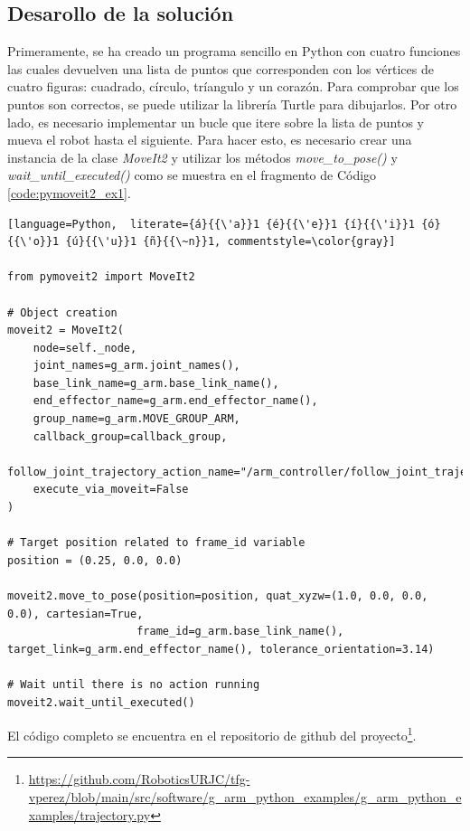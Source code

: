 \subsection*{Desarollo de la solución}
\noindent Primeramente, se ha creado un programa sencillo en Python con cuatro funciones las cuales devuelven una lista de puntos que corresponden 
con los vértices de cuatro figuras: cuadrado, círculo, tríangulo y un corazón. Para comprobar que los puntos son correctos, se puede utilizar la librería 
Turtle para dibujarlos. Por otro lado, es necesario implementar un bucle que itere sobre la lista de puntos y mueva el robot hasta el siguiente. Para hacer 
esto, es necesario crear una instancia de la clase \textit{MoveIt2} y utilizar los métodos \textit{move\_to\_pose()} y \textit{wait\_until\_executed()} 
como se muestra en el fragmento de Código \ref{code:pymoveit2_ex1}.
\begin{code}[ht!]
\begin{lstlisting}[language=Python,  literate={á}{{\'a}}1 {é}{{\'e}}1 {í}{{\'i}}1 {ó}{{\'o}}1 {ú}{{\'u}}1 {ñ}{{\~n}}1, commentstyle=\color{gray}]
    
from pymoveit2 import MoveIt2

# Object creation
moveit2 = MoveIt2(
    node=self._node,
    joint_names=g_arm.joint_names(),
    base_link_name=g_arm.base_link_name(),
    end_effector_name=g_arm.end_effector_name(),
    group_name=g_arm.MOVE_GROUP_ARM,
    callback_group=callback_group,
    follow_joint_trajectory_action_name="/arm_controller/follow_joint_trajectory",
    execute_via_moveit=False
)

# Target position related to frame_id variable
position = (0.25, 0.0, 0.0) 

moveit2.move_to_pose(position=position, quat_xyzw=(1.0, 0.0, 0.0, 0.0), cartesian=True, 
                    frame_id=g_arm.base_link_name(), target_link=g_arm.end_effector_name(), tolerance_orientation=3.14)

# Wait until there is no action running                  
moveit2.wait_until_executed()

\end{lstlisting}
\caption{Uso básico de PyMoveIt2 para moverse a un punto}
\label{code:pymoveit2_ex1}
\end{code}

\newpage
El código completo se encuentra en el repositorio de github del 
proyecto\footnote{\url{https://github.com/RoboticsURJC/tfg-vperez/blob/main/src/software/g\_arm\_python_examples/g\_arm_python\_examples/trajectory.py}}.


